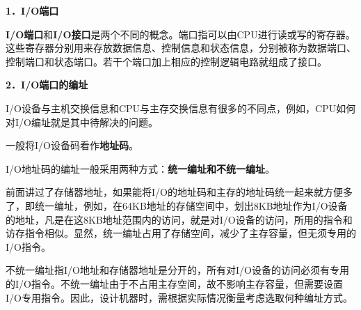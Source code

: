 {\textbf{1．I/O端口}}

\textbf{I/O端口}和\textbf{I/O接口}是两个不同的概念。{端口}指可以由CPU进行读或写的寄存器。这些寄存器分别用来存放数据信息、控制信息和状态信息，分别被称为数据端口、控制端口和状态端口。若干个端口加上相应的控制逻辑电路就组成了{接口}。

{\textbf{2．I/O端口的编址}}

I/O设备与主机交换信息和CPU与主存交换信息有很多的不同点，例如，CPU如何对I/O编址就是其中待解决的问题。

一般将I/O设备码看作\textbf{地址码}。

I/O地址码的编址一般采用两种方式：\textbf{统一编址和不统一编址}。

前面讲过了存储器地址，如果能将I/O的地址码和主存的地址码统一起来就方便多了，即{统一编址}，例如，在64KB地址的存储空间中，划出8KB地址作为I/O设备的地址，凡是在这8KB地址范围内的访问，就是对I/O设备的访问，所用的指令和访存指令相似。显然，统一编址占用了存储空间，减少了主存容量，但无须专用的I/O指令。

{不统一编址}指I/O地址和存储器地址是分开的，所有对I/O设备的访问必须有专用的I/O指令。不统一编址由于不占用主存空间，故不影响主存容量，但需要设置I/O专用指令。因此，设计机器时，需根据实际情况衡量考虑选取何种编址方式。

